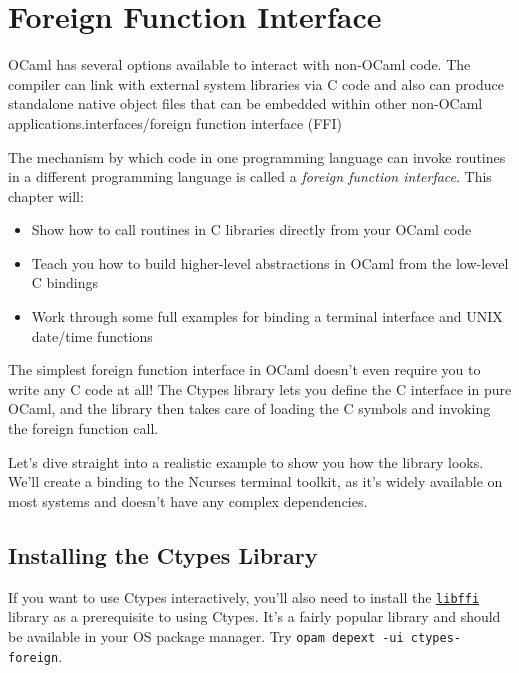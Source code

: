 \hypertarget{foreign-function-interface}{%
\section{Foreign Function Interface}\label{foreign-function-interface}}

OCaml has several options available to interact with non-OCaml code. The
compiler can link with external system libraries via C code and also can
produce standalone native object files that can be embedded within other
non-OCaml
applications.\protect\hypertarget{INTERffi}{}{interfaces/foreign
function interface (FFI)}

The mechanism by which code in one programming language can invoke
routines in a different programming language is called a \emph{foreign
function interface}. This chapter will:

\begin{itemize}
\item
  Show how to call routines in C libraries directly from your OCaml code
\item
  Teach you how to build higher-level abstractions in OCaml from the
  low-level C bindings
\item
  Work through some full examples for binding a terminal interface and
  UNIX date/time functions
\end{itemize}

The simplest foreign function interface in OCaml doesn't even require
you to write any C code at all! The Ctypes library lets you define the C
interface in pure OCaml, and the library then takes care of loading the
C symbols and invoking the foreign function
call.

Let's dive straight into a realistic example to show you how the library
looks. We'll create a binding to the Ncurses terminal toolkit, as it's
widely available on most systems and doesn't have any complex
dependencies.

\hypertarget{installing-the-ctypes-library}{%
\subsection{Installing the Ctypes
Library}\label{installing-the-ctypes-library}}

If you want to use Ctypes interactively, you'll also need to install the
\href{https://github.com/atgreen/libffi}{\passthrough{\lstinline!libffi!}}
library as a prerequisite to using Ctypes. It's a fairly popular library
and should be available in your OS package manager. Try
\passthrough{\lstinline!opam depext -ui ctypes-foreign!}.

